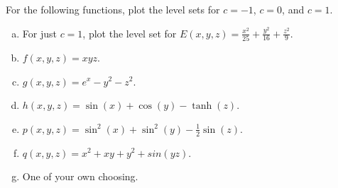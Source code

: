 \documentclass[12pt]{article} %
\begin{document}
\newpage
\begin{problem}
For the following functions, plot the level sets for $c=-1$, $c=0$, and $c=1$. 
\begin{multicols}{2}
\begin{enumerate}[(a)]
    \item For just $c=1$, plot the level set for $E(x,y,z) = \frac{x^2}{25} + \frac{y^2}{16} + \frac{z^2}{9}$.
    \item $f(x,y,z) = xyz$.
    \item $g(x,y,z) = e^x-y^2-z^2$.
    \item $h(x,y,z) = \sin(x)+\cos(y)-\tanh(z)$.
    \item $p(x,y,z) = \sin^2(x)+\sin^2(y)-\frac{1}{2}\sin(z)$.
    \item $q(x,y,z) = x^2+xy+y^2+sin(yz)$.
    \item One of your own choosing.
\end{enumerate}
\end{multicols}
\end{problem}
\end{document}
